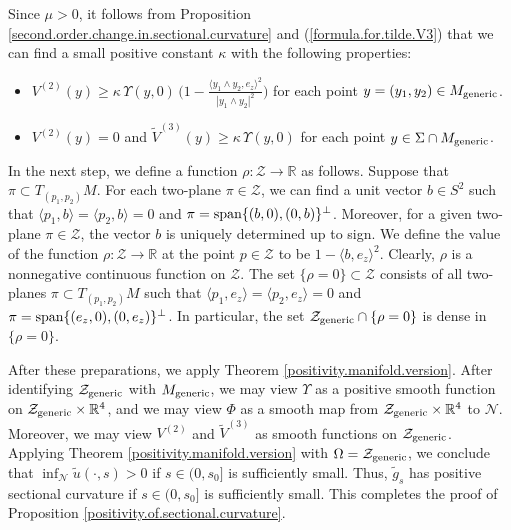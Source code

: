 \documentclass[11pt]{amsart}
\theoremstyle{definition}
\begin{document}
Since $\mu > 0$, it follows from Proposition \ref{second.order.change.in.sectional.curvature} and (\ref{formula.for.tilde.V3}) that we can find a small positive constant $\kappa$ with the following properties:
\begin{itemize} 
\item $V^{(2)}(y) \geq \kappa \, \Upsilon(y,0) \, \big ( 1 - \frac{\langle y_1 \wedge y_2,e_z \rangle^2}{|y_1 \wedge y_2|^2} \big )$ for each point $y = (y_1,y_2) \in M_{\text{\rm generic}}$. 
\item $V^{(2)}(y) = 0$ and $\tilde{V}^{(3)}(y) \geq \kappa \, \Upsilon(y,0)$ for each point $y \in \Sigma \cap M_{\text{\rm generic}}$. 
\end{itemize}

In the next step, we define a function $\rho: \mathcal{Z} \to \mathbb{R}$ as follows. Suppose that $\pi \subset T_{(p_1,p_2)} M$. For each two-plane $\pi \in \mathcal{Z}$, we can find a unit vector $b \in S^2$ such that $\langle p_1,b \rangle = \langle p_2,b \rangle = 0$ and $\pi = \text{\rm span}\{(b,0),(0,b)\}^\perp$. Moreover, for a given two-plane $\pi \in \mathcal{Z}$, the vector $b$ is uniquely determined up to sign. We define the value of the function $\rho: \mathcal{Z} \to \mathbb{R}$ at the point $p \in \mathcal{Z}$ to be $1-\langle b,e_z \rangle^2$. Clearly, $\rho$ is a nonnegative continuous function on $\mathcal{Z}$. The set $\{\rho=0\} \subset \mathcal{Z}$ consists of all two-planes $\pi \subset T_{(p_1,p_2)} M$ such that $\langle p_1,e_z \rangle = \langle p_2,e_z \rangle = 0$ and $\pi = \text{\rm span}\{(e_z,0),(0,e_z)\}^\perp$. In particular, the set $\mathcal{Z}_{\text{\rm generic}} \cap \{\rho=0\}$ is dense in $\{\rho=0\}$.

After these preparations, we apply Theorem \ref{positivity.manifold.version}. After identifying $\mathcal{Z}_{\rm generic}$ with $M_{\text{\rm generic}}$, we may view $\Upsilon$ as a positive smooth function on $\mathcal{Z}_{\text{\rm generic}} \times \mathbb{R}^4$, and we may view $\Phi$ as a smooth map from $\mathcal{Z}_{\text{\rm generic}} \times \mathbb{R}^4$ to $\mathcal{N}$. Moreover, we may view $V^{(2)}$ and $\tilde{V}^{(3)}$ as smooth functions on $\mathcal{Z}_{\text{\rm generic}}$. Applying Theorem \ref{positivity.manifold.version} with $\Omega = \mathcal{Z}_{\text{\rm generic}}$, we conclude that $\inf_{\mathcal{N}} \tilde{u}(\cdot,s) > 0$ if $s \in (0,s_0]$ is sufficiently small. Thus, $\tilde{g}_s$ has positive sectional curvature if $s \in (0,s_0]$ is sufficiently small. This completes the proof of Proposition \ref{positivity.of.sectional.curvature}. \\
\end{document}
